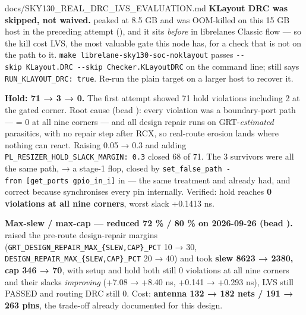 \begin{relocated}{docs/SKY130_REAL_DRC_LVS_EVALUATION.md}
\textbf{KLayout DRC was skipped, not waived.}  peaked
at 8.5 GB and was OOM-killed on this 15 GB host in the preceding attempt
(), and it sits \emph{before}
 in librelane\textquotesingle s Classic flow --- so the
kill cost LVS, the most valuable gate this node has, for a check that is
not on the path to it.
\texttt{make\ librelane-\allowbreak{}sky130-\allowbreak{}soc-\allowbreak{}noklayout}
passes
\texttt{-\allowbreak{}-\allowbreak{}skip\ KLayout.\allowbreak{}DRC\ -\allowbreak{}-\allowbreak{}skip\ Checker.\allowbreak{}KLayoutDRC}
on the command line;  still says
\texttt{RUN\_\allowbreak{}KLAYOUT\_\allowbreak{}DRC:\allowbreak{}\ true}.
Re-run the plain target on a larger host to recover it.

\textbf{Hold: 71 → 3 → 0.} The first attempt showed 71 hold violations
including 2 at the gated  corner. Root cause (bead
): every violation was a boundary-port path ---
 = 0 at all nine corners --- and all
design repair runs on GRT-\emph{estimated} parasitics, with no repair
step after RCX, so real-route erosion lands where nothing can react.
Raising  0.05 → 0.3 and adding
\texttt{PL\_\allowbreak{}RESIZER\_\allowbreak{}HOLD\_\allowbreak{}SLACK\_\allowbreak{}MARGIN:\allowbreak{}\ 0.\allowbreak{}3}
closed 68 of 71. The 3 survivors were all the same path,
 → a  stage-1 flop, closed by
\texttt{set\_\allowbreak{}false\_\allowbreak{}path\ -\allowbreak{}from\ [get\_\allowbreak{}ports\ gpio\_\allowbreak{}in\_\allowbreak{}i]}
in  --- the same treatment  and
 already had, and correct because
 synchronises every pin internally. Verified:
hold reaches \textbf{0 violations at all nine corners}, worst slack
+0.1413 ns.

\textbf{Max-slew / max-cap --- reduced 72 \% / 80 \% on 2026-09-26 (bead
).}  raised the pre-route
design-repair margins
(\texttt{GRT\_\allowbreak{}DESIGN\_\allowbreak{}REPAIR\_\allowbreak{}MAX\_\allowbreak{}\{SLEW,\allowbreak{}CAP\}\_\allowbreak{}PCT}
10 → 30,
\texttt{DESIGN\_\allowbreak{}REPAIR\_\allowbreak{}MAX\_\allowbreak{}\{SLEW,\allowbreak{}CAP\}\_\allowbreak{}PCT}
20 → 40) and took \textbf{slew 8623 → 2380, cap 346 → 70}, with setup
and hold both still 0 violations at all nine corners and their slacks
\emph{improving} (+7.08 → +8.40 ns, +0.141 → +0.293 ns), LVS still
PASSED and routing DRC still 0. Cost: \textbf{antenna 132 → 182 nets /
191 → 263 pins}, the trade-off  already
documented for this design.


\end{relocated}
